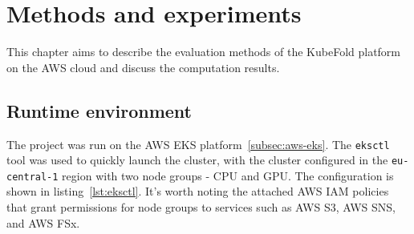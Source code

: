 \chapter{Methods and experiments}

This chapter aims to describe the evaluation methods of the KubeFold platform on the AWS cloud and discuss the computation results.

\section{Runtime environment}

The project was run on the AWS EKS platform~\ref{subsec:aws-eks}.
The \texttt{eksctl} tool was used to quickly launch the cluster, with the cluster configured in the \texttt{eu-central-1} region with two node groups - CPU and GPU.
The configuration is shown in listing~\ref{lst:eksctl}.
It's worth noting the attached AWS IAM policies that grant permissions for node groups to services such as AWS S3, AWS SNS, and AWS FSx.

